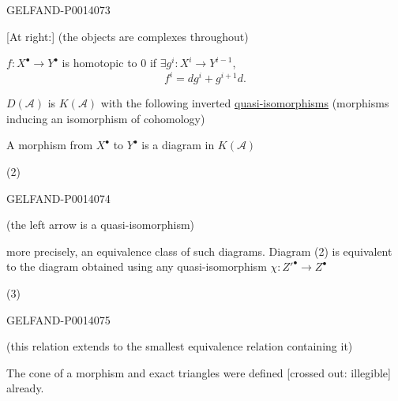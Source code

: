 \begin{GelfandAdjacentEvidence}{GELFAND-P001407}{3}

[At right:] (the objects are complexes throughout)

\(f:X^\bullet\to Y^\bullet\) is homotopic to \(0\) if
\(\exists g^i:X^i\to Y^{i-1}\),
\[
f^i=dg^i+g^{i+1}d.
\]

\(D(\mathcal A)\) is \(K(\mathcal A)\) with the following inverted
\uline{quasi-isomorphisms}
(morphisms inducing an isomorphism of cohomology)

A morphism from \(X^\bullet\) to \(Y^\bullet\) is a diagram in \(K(\mathcal A)\)

(2)
\end{GelfandAdjacentEvidence}
\begin{GelfandAdjacentEvidence}{GELFAND-P001407}{4}

(the left arrow is a quasi-isomorphism)

more precisely, an equivalence class of such diagrams. Diagram (2) is equivalent to the diagram obtained using any quasi-isomorphism
\(\chi:Z'^\bullet\to Z^\bullet\)

(3)
\end{GelfandAdjacentEvidence}
\begin{GelfandAdjacentEvidence}{GELFAND-P001407}{5}


(this relation extends to the smallest equivalence relation containing it)

The cone of a morphism and exact triangles were defined [crossed out: illegible] already.
\end{GelfandAdjacentEvidence}



